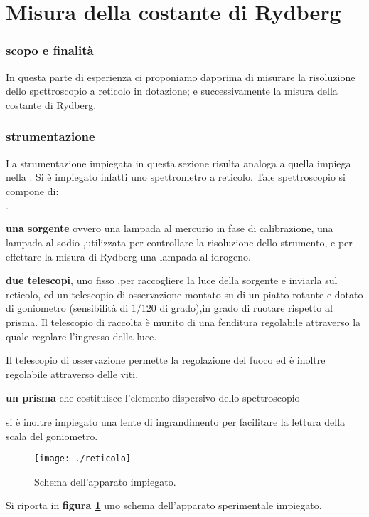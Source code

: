 \part{Misura della costante di Rydberg}
\section{scopo e finalità}
	In questa parte di esperienza ci proponiamo dapprima di misurare la
	risoluzione dello spettroscopio a reticolo in dotazione;
	e successivamente la misura della costante di Rydberg.
\section{strumentazione}
	La strumentazione impiegata
	in questa sezione risulta analoga a quella impiega
	nella .
	Si è impiegato infatti uno spettrometro a reticolo.
	Tale spettroscopio si compone di:
	\begin{list}{$\cdot$}{}
		\item \textbf{una sorgente } ovvero una lampada al mercurio in fase di
		calibrazione, una lampada al sodio ,utilizzata per controllare la risoluzione dello strumento, e per effettare la misura di Rydberg
		una lampada al idrogeno.
		\item \textbf{due telescopi}, uno fisso	,per raccogliere la luce della
		sorgente e inviarla sul reticolo, ed un telescopio di osservazione
		montato su di un piatto rotante e dotato di goniometro
		(sensibilità di $1/120$ di grado),in grado di ruotare
		rispetto al prisma.
		Il telescopio di raccolta  è munito di una fenditura regolabile
		attraverso la quale regolare l'ingresso della luce.

		Il telescopio di osservazione permette la regolazione del fuoco ed è
		inoltre regolabile attraverso delle viti.
		\item \textbf{un prisma} che costituisce l'elemento dispersivo dello
		spettroscopio
	\end{list}
	\bigskip
	si è inoltre impiegato una lente di ingrandimento per facilitare la lettura della scala del goniometro.

\bigskip


\begin{figure} [!h]
	\centering
	\texttt{[image: ./reticolo]}
	\caption{Schema dell'apparato impiegato.}
	\label{fig:reticolo}
\end{figure}
Si riporta in \textbf{figura \ref{fig:reticolo} }uno schema dell'apparato
sperimentale impiegato.
